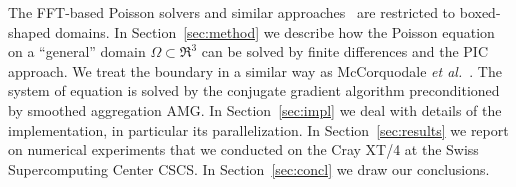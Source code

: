 The FFT-based Poisson solvers and similar approaches~\cite{qiry01,
  qigl04} are restricted to boxed-shaped domains.  In
Section~\ref{sec:method} we describe how the Poisson equation on a
``general'' domain $\Omega \subset \Re^3$ can be solved by finite
differences and the PIC approach.  We treat the boundary in a similar
way as McCorquodale \textit{et al.}~\cite{mcgv:04}.  The system of
equation is solved by the conjugate gradient algorithm preconditioned by
smoothed aggregation AMG.  In Section~\ref{sec:impl} we deal with
details of the implementation, in particular its parallelization.  In
Section~\ref{sec:results} we report on numerical experiments that we
conducted on the Cray XT/4 at the Swiss Supercomputing Center CSCS.
In Section~\ref{sec:concl} we draw our conclusions.





